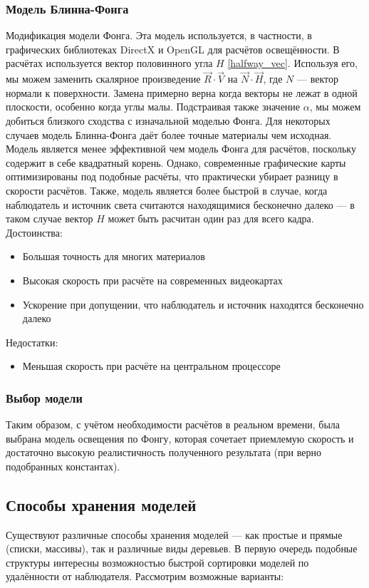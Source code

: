 \documentclass[a4paper,12pt]{report}
\numberwithin{equation}{section}
\begin{document}
\subsubsection*{Модель Блинна-Фонга}
Модификация модели Фонга. Эта модель используется, в частности, в графических библиотеках DirectX и OpenGL для расчётов освещённости. В расчётах используется вектор половинного угла $H$ \eqref{halfway_vec}. Используя его, мы можем заменить скалярное произведение $\vec{R} \cdot \vec{V}$ на $\vec{N} \cdot \vec{H}$, где $N$ --- вектор нормали к поверхности. Замена примерно верна когда векторы не лежат в одной плоскости, особенно когда углы малы. Подстраивая также значение $\alpha$, мы можем добиться близкого сходства с изначальной моделью Фонга. Для некоторых случаев модель Блинна-Фонга даёт более точные материалы чем исходная. \\
Модель является менее эффективной чем модель Фонга для расчётов, поскольку содержит в себе квадратный корень. Однако, современные графические карты оптимизированы под подобные расчёты, что практически убирает разницу в скорости расчётов. Также, модель является более быстрой в случае, когда наблюдатель и источник света считаются находящимися бесконечно далеко --- в таком случае вектор $H$ может быть расчитан один раз для всего кадра. \\
Достоинства:
\begin{itemize}
\item Большая точность для многих материалов
\item Высокая скорость при расчёте на современных видеокартах
\item Ускорение при допущении, что наблюдатель и источник находятся бесконечно далеко
\end{itemize}
Недостатки:
\begin{itemize}
\item Меньшая скорость при расчёте на центральном процессоре
\end{itemize}

\subsubsection*{Выбор модели}
Таким образом, с учётом необходимости расчётов в реальном времени, была выбрана модель освещения по Фонгу, которая сочетает приемлемую скорость и достаточно высокую реалистичность полученного результата (при верно подобранных константах).

\subsection{Способы хранения моделей}
Существуют различные способы хранения моделей --- как простые и прямые (списки, массивы), так и различные виды деревьев. В первую очередь подобные структуры интересны возможностью быстрой сортировки моделей по удалённости от наблюдателя. Рассмотрим возможные варианты:
\end{document}
